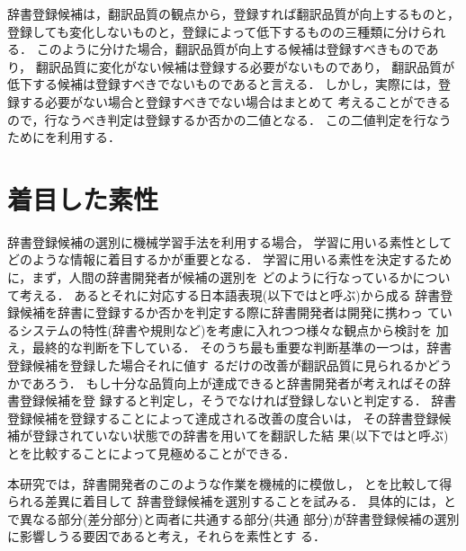 辞書登録候補は，翻訳品質の観点から，登録すれば翻訳品質が向上するものと，
登録しても変化しないものと，登録によって低下するものの三種類に分けられる．
このように分けた場合，翻訳品質が向上する候補は登録すべきものであり，
翻訳品質に変化がない候補は登録する必要がないものであり，
翻訳品質が低下する候補は登録すべきでないものであると言える．
しかし，実際には，登録する必要がない場合と登録すべきでない場合はまとめて
考えることができるので，行なうべき判定は登録するか否かの二値となる．
この二値判定を行なうために{\SVM}を利用する．


\section{着目した素性}
\label{sec:feats}

辞書登録候補の選別に機械学習手法を利用する場合，
学習に用いる素性としてどのような情報に着目するかが重要となる．
学習に用いる素性を決定するために，まず，人間の辞書開発者が候補の選別を
どのように行なっているかについて考える．
ある{\ENP}とそれに対応する日本語表現(以下では{\NT}と呼ぶ)から成る
辞書登録候補を辞書に登録するか否かを判定する際に辞書開発者は開発に携わっ
ているシステムの特性(辞書や規則など)を考慮に入れつつ様々な観点から検討を
加え，最終的な判断を下している．
そのうち最も重要な判断基準の一つは，辞書登録候補を登録した場合それに値す
るだけの改善が翻訳品質に見られるかどうかであろう．
もし十分な品質向上が達成できると辞書開発者が考えればその辞書登録候補を登
録すると判定し，そうでなければ登録しないと判定する．
辞書登録候補を登録することによって達成される改善の度合いは，
その辞書登録候補が登録されていない状態での辞書を用いて{\ENP}を翻訳した結
果(以下では{\CT}と呼ぶ)と{\NT}を比較することによって見極めることができる．

本研究では，辞書開発者のこのような作業を機械的に模倣し，
{\CT}と{\NT}を比較して得られる差異に着目して
辞書登録候補を選別することを試みる．
具体的には，{\CT}と{\NT}で異なる部分(差分部分)と両者に共通する部分(共通
部分)が辞書登録候補の選別に影響しうる要因であると考え，それらを素性とす
る．

